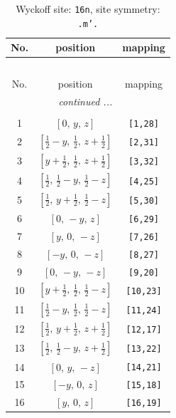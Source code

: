 \documentclass[fleqn,8pt]{jsarticle}
\begin{document}
\renewcommand{\arraystretch}{1.2}
\begin{longtable}{ccc}
\caption{Wyckoff site: {\tt 16n}, site symmetry: {\tt .m'.}}
 \\
 \hline \hline
No. & position & mapping \\ \hline \endfirsthead

\multicolumn{2}{l}{\tablename\ \thetable{}} \\
 \hline \hline
No. & position & mapping \\ \hline \endhead

 \hline \hline
\multicolumn{2}{r}{\footnotesize\it continued ...} \\ \endfoot

 \hline \hline
\multicolumn{2}{r}{} \\ \endlastfoot

1 & $\left[ 0,\, y,\, z \right]$ & {\tt [1,28]} \\ \hline
2 & $\left[ \frac{1}{2} - y,\, \frac{1}{2},\, z + \frac{1}{2} \right]$ & {\tt [2,31]} \\ \hline
3 & $\left[ y + \frac{1}{2},\, \frac{1}{2},\, z + \frac{1}{2} \right]$ & {\tt [3,32]} \\ \hline
4 & $\left[ \frac{1}{2},\, \frac{1}{2} - y,\, \frac{1}{2} - z \right]$ & {\tt [4,25]} \\ \hline
5 & $\left[ \frac{1}{2},\, y + \frac{1}{2},\, \frac{1}{2} - z \right]$ & {\tt [5,30]} \\ \hline
6 & $\left[ 0,\, - y,\, z \right]$ & {\tt [6,29]} \\ \hline
7 & $\left[ y,\, 0,\, - z \right]$ & {\tt [7,26]} \\ \hline
8 & $\left[ - y,\, 0,\, - z \right]$ & {\tt [8,27]} \\ \hline
9 & $\left[ 0,\, - y,\, - z \right]$ & {\tt [9,20]} \\ \hline
10 & $\left[ y + \frac{1}{2},\, \frac{1}{2},\, \frac{1}{2} - z \right]$ & {\tt [10,23]} \\ \hline
11 & $\left[ \frac{1}{2} - y,\, \frac{1}{2},\, \frac{1}{2} - z \right]$ & {\tt [11,24]} \\ \hline
12 & $\left[ \frac{1}{2},\, y + \frac{1}{2},\, z + \frac{1}{2} \right]$ & {\tt [12,17]} \\ \hline
13 & $\left[ \frac{1}{2},\, \frac{1}{2} - y,\, z + \frac{1}{2} \right]$ & {\tt [13,22]} \\ \hline
14 & $\left[ 0,\, y,\, - z \right]$ & {\tt [14,21]} \\ \hline
15 & $\left[ - y,\, 0,\, z \right]$ & {\tt [15,18]} \\ \hline
16 & $\left[ y,\, 0,\, z \right]$ & {\tt [16,19]} \\
\end{longtable}
\end{document}
